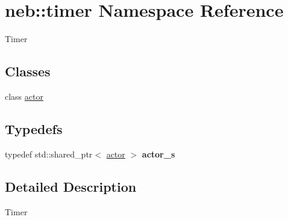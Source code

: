 \hypertarget{namespaceneb_1_1timer}{
\section{neb::timer Namespace Reference}
\label{namespaceneb_1_1timer}
}


Timer  
\subsection*{Classes}
\begin{DoxyCompactItemize}
\item 
class \hyperlink{classneb_1_1timer_1_1actor}{actor}
\end{DoxyCompactItemize}
\subsection*{Typedefs}
\begin{DoxyCompactItemize}
\item 
\hypertarget{namespaceneb_1_1timer_a85f47de65beb55ac71e55979e725ba89}{
typedef std::shared\_\-ptr$<$ \hyperlink{classneb_1_1timer_1_1actor}{actor} $>$ {\bfseries actor\_\-s}}
\label{namespaceneb_1_1timer_a85f47de65beb55ac71e55979e725ba89}

\end{DoxyCompactItemize}


\subsection{Detailed Description}
Timer 